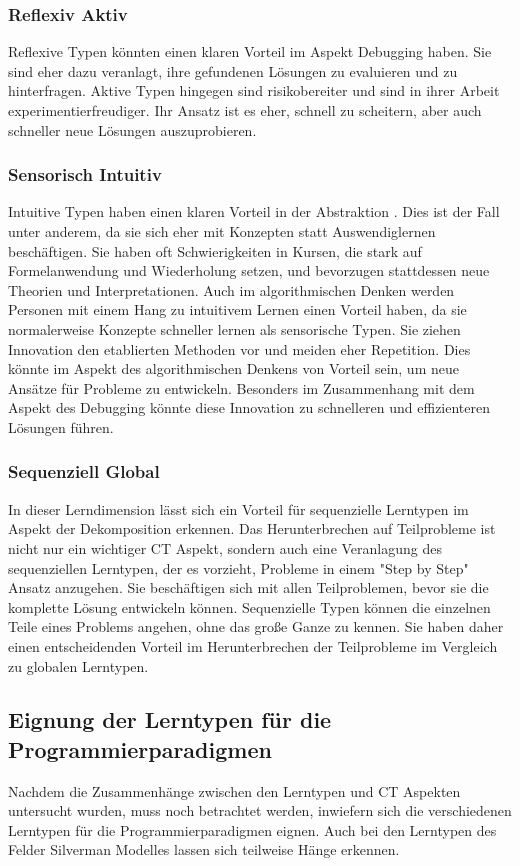 \subsubsection{Reflexiv Aktiv}
Reflexive Typen könnten einen klaren Vorteil im Aspekt Debugging haben. Sie sind eher dazu veranlagt, ihre gefundenen Lösungen zu evaluieren und zu hinterfragen. Aktive Typen hingegen sind risikobereiter und sind in ihrer Arbeit experimentierfreudiger. Ihr Ansatz ist es eher, schnell zu scheitern, aber auch schneller neue Lösungen auszuprobieren.

\subsubsection{Sensorisch Intuitiv}
Intuitive Typen haben einen klaren Vorteil in der Abstraktion \cite{felderhandout}. Dies ist der Fall unter anderem, da sie sich eher mit Konzepten statt Auswendiglernen beschäftigen. Sie haben oft Schwierigkeiten in Kursen, die stark auf Formelanwendung und Wiederholung setzen, und bevorzugen stattdessen neue Theorien und Interpretationen.
Auch im algorithmischen Denken werden Personen mit einem Hang zu intuitivem Lernen einen Vorteil haben, da sie normalerweise Konzepte schneller lernen als sensorische Typen. Sie ziehen Innovation den etablierten Methoden vor und meiden eher Repetition. Dies könnte im Aspekt des algorithmischen Denkens von Vorteil sein, um neue Ansätze für Probleme zu entwickeln. Besonders im Zusammenhang mit dem Aspekt des Debugging könnte diese Innovation zu schnelleren und effizienteren Lösungen führen.

\subsubsection{Sequenziell Global}
In dieser Lerndimension lässt sich ein Vorteil für sequenzielle Lerntypen im Aspekt der Dekomposition erkennen. Das Herunterbrechen auf Teilprobleme ist nicht nur ein wichtiger CT Aspekt, sondern auch eine Veranlagung des sequenziellen Lerntypen, der es vorzieht, Probleme in einem "Step by Step" Ansatz anzugehen. Sie beschäftigen sich mit allen Teilproblemen, bevor sie die komplette Lösung entwickeln können. Sequenzielle Typen können die einzelnen Teile eines Problems angehen, ohne das große Ganze zu kennen. Sie haben daher einen entscheidenden Vorteil im Herunterbrechen der Teilprobleme im Vergleich zu globalen Lerntypen.

\subsection{Eignung der Lerntypen für die Programmierparadigmen}
Nachdem die Zusammenhänge zwischen den Lerntypen und CT Aspekten untersucht wurden, muss noch betrachtet werden, inwiefern sich die verschiedenen Lerntypen für die Programmierparadigmen eignen.
Auch bei den Lerntypen des Felder Silverman Modelles lassen sich teilweise Hänge erkennen.

